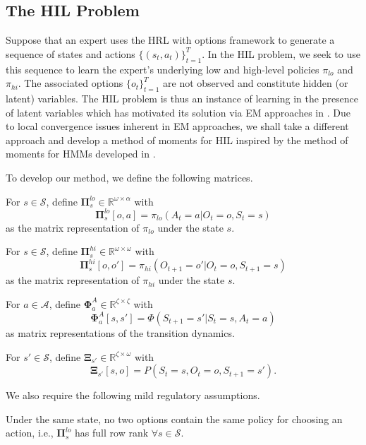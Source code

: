 \subsection{The HIL Problem}

Suppose that an expert uses the HRL with options framework to generate a sequence of states and actions $\{(s_t,a_t)\}_{t = 1}^T$.
In the HIL problem, we seek to use this sequence to learn the expert's underlying low and high-level policies $\pi_{lo}$ and $\pi_{hi}$.
The associated options $\{o_t\}_{t = 1}^T$ are not observed and constitute hidden (or latent) variables.
The HIL problem is thus an instance of learning in the presence of latent variables which has motivated its solution via EM approaches in \citep{Daniel2016,zhiyu20,Giammarino_2021}.
Due to local convergence issues inherent in EM approaches, we shall take a different approach and develop a method of moments for HIL inspired by the method of moments for HMMs developed in \citep{hsu08}.

To develop our method, we define the following matrices.
\begin{definition}
    For $s \in \mathcal{S}$, define $\bm{\Pi}^{lo}_s\in\mathbb{R}^{\omega\times\alpha}$ with $$\bm{\Pi}^{lo}_s[o,a] = \pi_{lo}(A_t=a\vert O_t=o,S_t=s)$$ as the matrix representation of $\pi_{lo}$ under the state $s$.
\end{definition}

\begin{definition}
    For $s \in \mathcal{S}$, define $\bm{\Pi}^{hi}_s\in\mathbb{R}^{\omega\times\omega}$ with $$\bm{\Pi}^{hi}_s[o,o'] = \pi_{hi}(O_{t+1} = o'\vert O_t = o,S_{t+1}=s)$$
    as the matrix representation of $\pi_{hi}$ under the state $s$.
\end{definition}

\begin{definition}
    For $a \in \mathcal{A}$, define $\bm{\Phi}^A_a\in\mathbb{R}^{\zeta\times\zeta}$ with
    \[
        \bm{\Phi}^A_a[s,s']=\Phi(S_{t+1} = s'\vert S_t = s, A_t=a)
    \]
    as matrix representations of the transition dynamics.
\end{definition}

\begin{definition}
    For $s'\in\mathcal{S}$, define $\bm{\Xi}_{s'}\in\mathbb{R}^{\zeta\times\omega}$ with $$\bm{\Xi}_{s'}[s,o] = P(S_t=s,O_t=o,S_{t+1}=s').$$
\end{definition}

We also require the following mild regulatory assumptions.
\begin{assumption}\label{asu:pilo}
Under the same state, no two options contain the same policy for choosing an action, i.e., $\bm{\Pi}^{lo}_s$ has full row rank $\forall s\in\mathcal{S}$.
\end{assumption}

